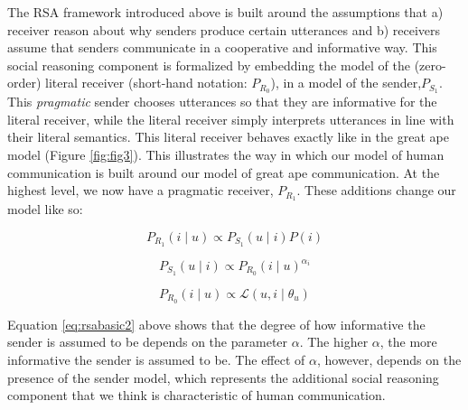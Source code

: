 \documentclass[
  man,floatsintext]{apa6}
\begin{document}
The RSA framework introduced above is built around the assumptions that a) receiver reason about why senders produce certain utterances and b) receivers assume that senders communicate in a cooperative and informative way. This social reasoning component is formalized by embedding the model of the (zero-order) literal receiver (short-hand notation: \(P_{R_0}\)), in a model of the sender,\(P_{S_1}\). This \emph{pragmatic} sender chooses utterances so that they are informative for the literal receiver, while the literal receiver simply interprets utterances in line with their literal semantics. This literal receiver behaves exactly like in the great ape model (Figure \ref{fig:fig3}). This illustrates the way in which our model of human communication is built around our model of great ape communication. At the highest level, we now have a pragmatic receiver, \(P_{R_1}\). These additions change our model like so:

\begin{equation}
P_{R_1}(i \mid u)\propto P_{S_1}(u \mid i) P(i)
\label{eq:rsabasic1}
\end{equation}

\begin{equation}
P_{S_1}(u \mid i)\propto P_{R_0}(i\mid u) ^{\alpha_i}
\label{eq:rsabasic2}
\end{equation}

\begin{equation}
P_{R_0}(i\mid u) \propto \mathcal{L}(u, i \mid \theta_{u})
\label{eq:rsabasic3}
\end{equation}

Equation \eqref{eq:rsabasic2} above shows that the degree of how informative the sender is assumed to be depends on the parameter \(\alpha\). The higher \(\alpha\), the more informative the sender is assumed to be. The effect of \(\alpha\), however, depends on the presence of the sender model, which represents the additional social reasoning component that we think is characteristic of human communication.
\end{document}
